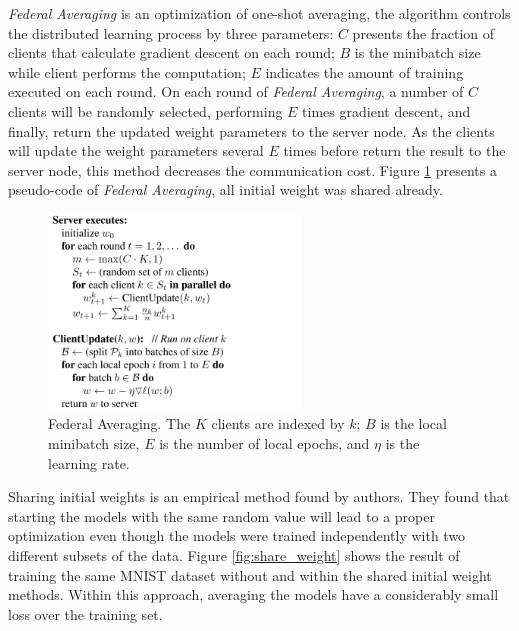 \documentclass[article]{aaltoseries}
\begin{document}
\emph{Federal Averaging} is an optimization of one-shot averaging, the algorithm controls the distributed learning process by
three parameters: $C$ presents the fraction of clients that calculate gradient descent on each round; $B$ is the minibatch size
while client performs the computation; $E$ indicates the amount of training executed on each round.
On each round of \emph{Federal Averaging}, a number of $C$ clients will be randomly selected, performing $E$ times gradient
descent, and finally, return the updated weight parameters to the server node. As the clients will update the 
weight parameters several $E$ times before return the result to the server node, this method decreases the communication cost.
Figure \ref{alg:FederalAveragingAlgorithm} presents a pseudo-code of \emph{Federal Averaging}, all initial weight was shared already.


\begin{figure}[t!]
  \begin{center}
    \includegraphics[width=0.6\textwidth]{figures/Algorithm}
    \caption{Federal Averaging. The $K$ clients are indexed by $k$; $B$ is the local minibatch size, 
            $E$ is the number of local epochs, and $η$ is the learning rate.}
    \label{alg:FederalAveragingAlgorithm}
  \end{center}
\end{figure}


Sharing initial weights is an empirical method found by authors. They found that starting the models with the same random
value will lead to a proper optimization even though the models were trained independently with two different subsets of the data.
Figure \ref{fig:share_weight} shows the result of training the same MNIST dataset \cite{lecun2010mnist} without and within the 
shared initial weight methods. 
Within this approach, averaging the models have a considerably small loss over the training set.
\end{document}

